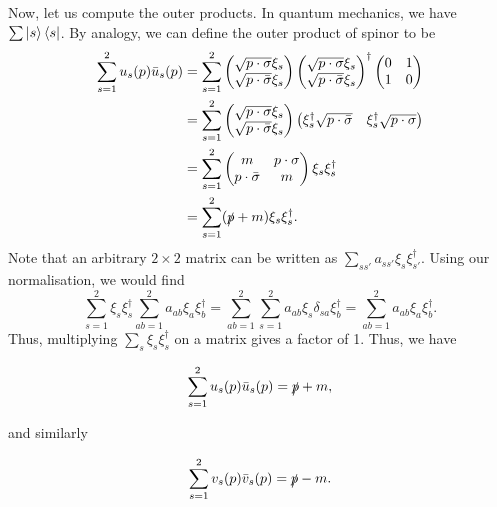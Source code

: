 \documentclass[11pt]{article}
\theoremstyle{definition}
\begin{document}
Now, let us compute the outer products. In quantum mechanics, we have $\sum\ket{s}\bra{s}$. By analogy, we can define the outer product of spinor to be
\begin{equation}
    \begin{aligned}
        \sum_{s=1}^2u_s(p)\bar{u}_s(p) &= \sum_{s=1}^2
        \begin{pmatrix}
        \sqrt{p\cdot \sigma}\xi_{s} \\
        \sqrt{p\cdot \bar{\sigma}}\xi_{s}
    \end{pmatrix}
    \begin{pmatrix}
        \sqrt{p\cdot \sigma}\xi_s \\
        \sqrt{p\cdot \bar{\sigma}}\xi_s
    \end{pmatrix}^\dagger
    \begin{pmatrix}
        0&1\\1&0
    \end{pmatrix}\\
    &= \sum_{s=1}^2
    \begin{pmatrix}
        \sqrt{p\cdot \sigma}\xi_{s} \\
        \sqrt{p\cdot \bar{\sigma}}\xi_{s}
    \end{pmatrix}
    \begin{pmatrix}
        \xi_s^\dagger \sqrt{p\cdot \bar{\sigma}} &
        \xi_s^\dagger \sqrt{p\cdot \sigma} 
    \end{pmatrix}\\
    &= \sum_{s=1}^2
    \begin{pmatrix}
        m & p \cdot \sigma \\
        p \cdot \bar{\sigma} & m \\
    \end{pmatrix}\xi_s\xi_s^\dagger\\
    &= \sum_{s=1}^2 (\slashed{p} + m)\xi_s\xi_s^\dagger.
    \end{aligned}
\end{equation}
Note that an arbitrary $2\times2$ matrix can be written as $\sum_{ss'}a_{ss'}\xi_s\xi_{s'}^\dagger$. Using our normalisation, we would find
\begin{equation}
    \sum_{s=1}^2 \xi_s\xi_s^\dagger \sum_{ab=1}^2 a_{ab} \xi_a\xi_b^\dagger = \sum_{ab=1}^2 \sum_{s=1}^2a_{ab{}} \xi_s \delta_{sa}\xi_b^\dagger = \sum_{ab=1}^2 a_{ab} \xi_a\xi_b^\dagger.
\end{equation}
Thus, multiplying $\sum_s \xi_s\xi_s^\dagger$ on a matrix gives a factor of 1. Thus, we have
\begin{shaded}
    \begin{equation}
        \sum_{s=1}^2u_s(p)\bar{u}_s(p) = \slashed{p} + m,
    \end{equation}
\end{shaded}
and similarly
\begin{shaded}
    \begin{equation}
        \sum_{s=1}^2v_s(p)\bar{v}_s(p) = \slashed{p} - m.
    \end{equation}
\end{shaded}
\end{document}
